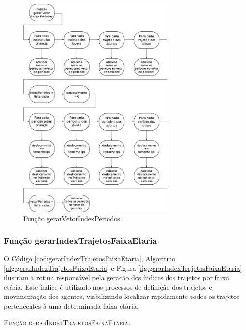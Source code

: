 \begin{figure}[H]
  \centering
  \includegraphics[width=0.7\textwidth]{Figuras/Simula/Fluxos/gerarVetorIndexPeriodos.eps}
  \caption{Função gerarVetorIndexPeriodos.}
  \label{fig:gerarVetorIndexPeriodos}
\end{figure} 

\newpage

\subsubsection{Função gerarIndexTrajetosFaixaEtaria}

O Código \ref{cod:gerarIndexTrajetosFaixaEtaria}, Algoritmo \ref{alg:gerarIndexTrajetosFaixaEtaria} e Figura \ref{fig:gerarIndexTrajetosFaixaEtaria} ilustram a rotina responsável pela geração dos índices dos trajetos por faixa etária. Este índice é utilizado nos processos de definição dos trajetos e movimentação dos agentes, viabilizando localizar rapidamente todos os trajetos pertencentes à uma determinada faixa etária. 



\begin{algorithm}[H]
   \SetAlgoLined   
   
   \caption{\textsc{Função gerarIndexTrajetosFaixaEtaria.}}
   \label{alg:gerarIndexTrajetosFaixaEtaria}
\end{algorithm}

